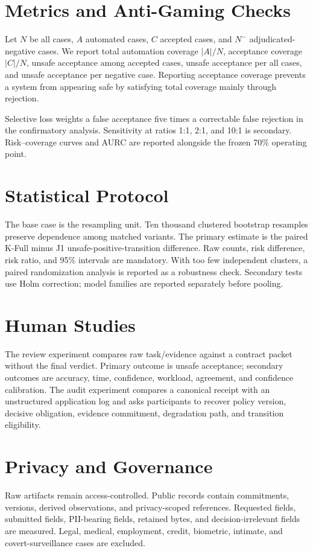 \documentclass[sigconf,anonymous,review]{acmart}
\begin{document}
\section{Metrics and Anti-Gaming Checks}
Let $N$ be all cases, $A$ automated cases, $C$ accepted cases, and $N^-$ adjudicated-negative cases. We report total automation coverage $|A|/N$, acceptance coverage $|C|/N$, unsafe acceptance among accepted cases, unsafe acceptance per all cases, and unsafe acceptance per negative case. Reporting acceptance coverage prevents a system from appearing safe by satisfying total coverage mainly through rejection.

Selective loss weights a false acceptance five times a correctable false rejection in the confirmatory analysis. Sensitivity at ratios 1:1, 2:1, and 10:1 is secondary. Risk--coverage curves and AURC are reported alongside the frozen 70\% operating point.

\section{Statistical Protocol}
The base case is the resampling unit. Ten thousand clustered bootstrap resamples preserve dependence among matched variants. The primary estimate is the paired K-Full minus J1 unsafe-positive-transition difference. Raw counts, risk difference, risk ratio, and 95\% intervals are mandatory. With too few independent clusters, a paired randomization analysis is reported as a robustness check. Secondary tests use Holm correction; model families are reported separately before pooling.

\section{Human Studies}
The review experiment compares raw task/evidence against a contract packet without the final verdict. Primary outcome is unsafe acceptance; secondary outcomes are accuracy, time, confidence, workload, agreement, and confidence calibration. The audit experiment compares a canonical receipt with an unstructured application log and asks participants to recover policy version, decisive obligation, evidence commitment, degradation path, and transition eligibility.

\section{Privacy and Governance}
Raw artifacts remain access-controlled. Public records contain commitments, versions, derived observations, and privacy-scoped references. Requested fields, submitted fields, PII-bearing fields, retained bytes, and decision-irrelevant fields are measured. Legal, medical, employment, credit, biometric, intimate, and covert-surveillance cases are excluded.
\end{document}
